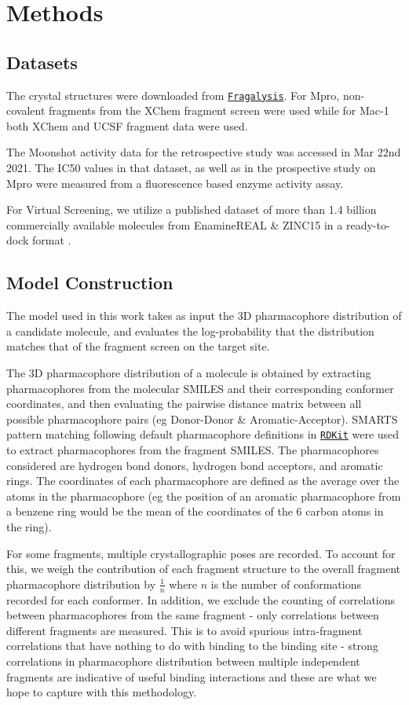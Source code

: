 \section{Methods} \label{sec:methods}
\subsection{Datasets}

The crystal structures were downloaded from \href{https://fragalysis.diamond.ac.uk/viewer/react/landing}{\texttt{Fragalysis}}. For Mpro, non-covalent fragments from the XChem fragment screen \cite{Douangamath2020XChem} were used while for Mac-1 both XChem and UCSF fragment data were used.

The Moonshot activity data for the retrospective study was accessed in Mar 22nd 2021. The IC50 values in that dataset, as well as in the prospective study on Mpro were measured from a fluorescence based enzyme activity assay.

For Virtual Screening, we utilize a published dataset of more than 1.4 billion commercially available molecules from EnamineREAL \& ZINC15 in a ready-to-dock format \cite{Gorgulla2020VirtualFlow}.

\subsection{Model Construction}
The model used in this work takes as input the 3D pharmacophore distribution of a candidate molecule, and evaluates the log-probability that the distribution matches that of the fragment screen on the target site.

The 3D pharmacophore distribution of a molecule is obtained by extracting pharmacophores from the molecular SMILES and their corresponding conformer coordinates, and then evaluating the pairwise distance matrix between all possible pharmacophore pairs (eg Donor-Donor \& Aromatic-Acceptor). SMARTS pattern matching following default pharmacophore definitions in \href{https://www.rdkit.org/docs/index.html}{\texttt{RDKit}} were used to extract pharmacophores from the fragment SMILES. The pharmacophores considered are hydrogen bond donors, hydrogen bond acceptors, and aromatic rings. The coordinates of each pharmacophore are defined as the average over the atoms in the pharmacophore (eg the position of an aromatic pharmacophore from a benzene ring would be the mean of the coordinates of the 6 carbon atoms in the ring). 

For some fragments, multiple crystallographic poses are recorded. To account for this, we weigh the contribution of each fragment structure to the overall fragment pharmacophore distribution by $\frac{1}{n}$ where $n$ is the number of conformations recorded for each conformer. In addition, we exclude the counting of correlations between pharmacophores from the same fragment - only correlations between different fragments are measured. This is to avoid spurious intra-fragment correlations that have nothing to do with binding to the binding site - strong correlations in pharmacophore distribution between multiple independent fragments are indicative of useful binding interactions and these are what we hope to capture with this methodology.

